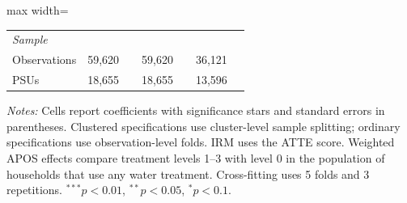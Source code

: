 \begin{table}[htbp]
\begin{adjustbox}{max width=\linewidth}
\begin{tabular}{lcccccc}
\midrule
\multicolumn{7}{l}{\textit{Sample}} \\
Observations & 59,620 &  & 59,620 &  & 36,121 &  \\
PSUs & 18,655 &  & 18,655 &  & 13,596 &  \\
\hline\hline
\end{tabular}
\end{adjustbox}
\par\vspace{3pt}
\begin{minipage}{\linewidth}\scriptsize \textit{Notes:} Cells report coefficients with significance stars and standard errors in parentheses. Clustered specifications use cluster-level sample splitting; ordinary specifications use observation-level folds. IRM uses the ATTE score. Weighted APOS effects compare treatment levels 1--3 with level 0 in the population of households that use any water treatment. Cross-fitting uses 5 folds and 3 repetitions. $^{***}p<0.01$, $^{**}p<0.05$, $^{*}p<0.1$.\end{minipage}
\end{table}